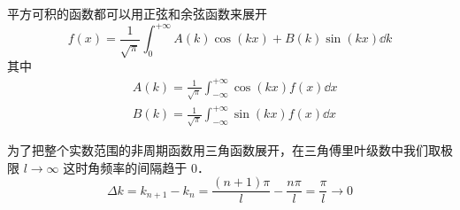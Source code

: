 
\begin{issues}
\issueDraft
\end{issues}

平方可积的函数都可以用正弦和余弦函数来展开
\begin{equation}
f(x) = \frac{1}{\sqrt{\pi}}\int_0^{+\infty} A(k) \cos(kx) + B(k)\sin(kx) \dd{k}
\end{equation}
其中
\begin{align}
&A(k) = \frac{1}{\sqrt{\pi}}\int_{-\infty}^{+\infty} \cos(kx) f(x) \dd{x}\\
&B(k) = \frac{1}{\sqrt{\pi}}\int_{-\infty}^{+\infty} \sin(kx) f(x) \dd{x}
\end{align}


为了把整个实数范围的非周期函数用三角函数展开，在三角傅里叶级数中我们取极限 $l\to\infty$ 这时角频率的间隔趋于 0．
\begin{equation}
\Delta k = k_{n+1} - k_n = \frac{(n+1)\pi}{l} - \frac{n\pi}{l} = \frac{\pi}{l} \to 0
\end{equation}
